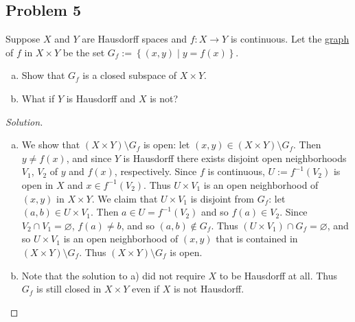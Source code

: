\documentclass[12pt]{article}
\newcommand\inv[1]{#1^{-1}}
\newcommand\setb[1]{\left \{ #1 \right \}}
\theoremstyle{definition}
\begin{document}
\subsection{Problem 5 \texorpdfstring{\cite{Munkres}}{}}
Suppose $X$ and $Y$ are Hausdorff spaces and $f : X \to Y$ is continuous. Let the \underline{graph} of $f$ in $X \times Y$ be the set $G_f := \setb{ (x,y) \mid y = f(x) }$.
\begin{enumerate}[a)]
    \item Show that $G_f$ is a closed subspace of $X \times Y$.
    \item What if $Y$ is Hausdorff and $X$ is not?
\end{enumerate}
\begin{proof}[Solution]
    \noindent
    \begin{enumerate}[a)]
        \item We show that $( X \times Y ) \setminus G_f$ is open: let $(x,y) \in ( X \times Y ) \setminus G_f$. Then $y \neq f(x)$, and since $Y$ is Hausdorff there exists disjoint open neighborhoods $V_1$, $V_2$ of $y$ and $f(x)$, respectively. Since $f$ is continuous, $U := \inv{f}(V_2)$ is open in $X$ and $x \in \inv{f}(V_2)$. Thus $U \times V_1$ is an open neighborhood of $(x,y)$ in $X \times Y$. We claim that $U \times V_1$ is disjoint from $G_f$: let $(a,b) \in U \times V_1$. Then $a \in U = \inv{f}(V_2)$ and so $f(a) \in V_2$. Since $V_2 \cap V_1 = \varnothing$, $f(a) \neq b$, and so $(a,b) \notin G_f$. Thus $(U \times V_1) \cap G_f = \varnothing$, and so $U \times V_1$ is an open neighborhood of $(x,y)$ that is contained in $( X \times Y ) \setminus G_f$. Thus $( X \times Y ) \setminus G_f$ is open.
        \item Note that the solution to a) did not require $X$ to be Hausdorff at all. Thus $G_f$ is still closed in $X \times Y$ even if $X$ is not Hausdorff. 
    \end{enumerate}
\end{proof}
\end{document}
